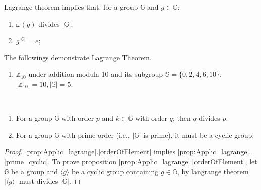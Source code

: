 \documentclass[../note.tex]{subfiles}
\begin{document}
\begin{proposition}
Lagrange theorem implies that:
for a group $\mathbb{G}$ and $g \in \mathbb{G}$:
\begin{enumerate}
	\item $\omega (g)$ divides $|\mathbb{G}|$; 
	\item $g^{|\mathbb{G}|}=e$;
\end{enumerate}
\end{proposition}

\begin{example}
	The followings demonstrate Lagrange Theorem.
	\begin{enumerate}
		\item $\mathbb{Z}_{10}$ under addition modula 10 and its subgroup $\mathbb{S} = \{0,2,4,6,10\}$. 
		$|\mathbb{Z}_{10}|=10, |\mathbb{S}|=5$.  
	\end{enumerate}
\end{example}



\begin{proposition}\label{prop:Applic_lagrange}
	\ 
\begin{enumerate}
	\item \label{orderOfElement}For a group $\mathbb{G}$ with order $p$ and $k \in \mathbb{G}$ with order $q$; then $q$ divides $p$.
	\item \label{prime_cyclic} For a group $\mathbb{G}$ with prime order (i.e., $|\mathbb{G}|$ is prime), it must be a cyclic group.
\end{enumerate}
\end{proposition}

\begin{proof}
	\ref{prop:Applic_lagrange}.\ref{orderOfElement} implies \ref{prop:Applic_lagrange}.\ref{prime_cyclic}.
	To prove proposition \ref{prop:Applic_lagrange}.\ref{orderOfElement}, let $\mathbb{G}$ be a group and $\langle g\rangle$ be a cyclic group containing $g \in \mathbb{G}$, by langrange theorem $|\langle g\rangle|$ must divides $|\mathbb{G}|$.
\end{proof}
\end{document}
